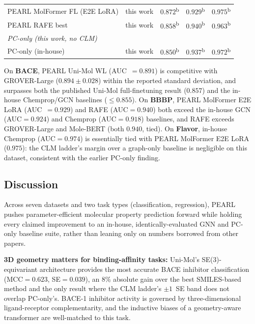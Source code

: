 \documentclass[pdflatex,sn-mathphys-num]{sn-jnl}%
\begin{document}
\begin{table}[!ht]
{\begin{tabular}{llccc}
PEARL MolFormer FL (E2E LoRA) & this work & $0.872$\textsuperscript{b}          & $0.929$\textsuperscript{b} & $\mathbf{0.975}$\textsuperscript{b} \\
PEARL RAFE best               & this work & $0.858$\textsuperscript{b}          & $\mathbf{0.940}$\textsuperscript{b}          & $0.963$\textsuperscript{b} \\
\midrule
\multicolumn{5}{l}{\textit{PC-only (this work, no CLM)}} \\[2pt]
PC-only (in-house)     & this work & $0.850$\textsuperscript{b}          & $0.937$\textsuperscript{b}          & $0.972$\textsuperscript{b} \\
\bottomrule
\end{tabular}
}
\end{table}

On \textbf{BACE}, PEARL Uni-Mol WL (AUC~$=0.891$) is competitive with GROVER-Large ($0.894\pm0.028$) within the reported standard deviation, and surpasses both the published Uni-Mol full-finetuning result ($0.857$) and the in-house Chemprop/GCN baselines ($\le0.855$). On \textbf{BBBP}, PEARL MolFormer E2E LoRA (AUC~$=0.929$) and RAFE (AUC$=0.940$) both exceed the in-house GCN (AUC$=0.924$) and Chemprop (AUC$=0.918$) baselines, and RAFE exceeds GROVER-Large and Mole-BERT (both $0.940$, tied). On \textbf{Flavor}, in-house Chemprop (AUC$=0.974$) is essentially tied with PEARL MolFormer E2E LoRA ($0.975$): the CLM ladder's margin over a graph-only baseline is negligible on this dataset, consistent with the earlier PC-only finding.

\subsection{Discussion}\label{sec:bace_discussion}
Across seven datasets and two task types (classification, regression), PEARL pushes parameter-efficient molecular property prediction forward while holding every claimed improvement to an in-house, identically-evaluated GNN and PC-only baseline suite, rather than leaning only on numbers borrowed from other papers.

\textbf{3D geometry matters for binding-affinity tasks:} Uni-Mol's SE(3)-equivariant architecture provides the most accurate BACE inhibitor classification (MCC$=0.623$, SE$=0.039$), an 8\% absolute gain over the best SMILES-based method and the only result where the CLM ladder's $\pm1$~SE band does not overlap PC-only's. BACE-1 inhibitor activity is governed by three-dimensional ligand-receptor complementarity, and the inductive biases of a geometry-aware transformer are well-matched to this task.
\end{document}
